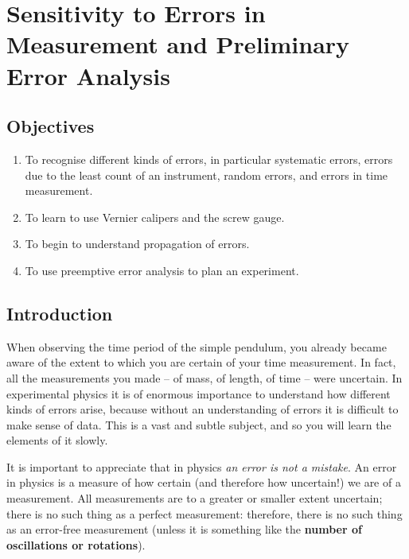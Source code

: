 \chapter{Sensitivity to Errors in Measurement and Preliminary Error Analysis}
\section{Objectives}

\begin{enumerate}
    \item To recognise different kinds of errors, in particular systematic errors, errors due to the least count of an instrument, random errors, and errors in time measurement.
    \item To learn to use Vernier calipers and the screw gauge.
    \item To begin to understand propagation of errors. 
    \item To use preemptive error analysis to plan an experiment. 
    
\end{enumerate}

\section{Introduction}

When observing the time period of the simple pendulum, you already became aware of the extent to which you are certain of your time measurement. In fact, all the measurements you made -- of mass, of length, of time -- were uncertain. In experimental physics it is of enormous importance to understand how different kinds of errors arise, because without an understanding of errors it is difficult to make sense of data. This is a vast and subtle subject, and so you will learn the elements of it slowly.

It is important to appreciate that in physics \textit{an error is not a mistake}. An error in physics is a measure of how certain (and therefore how uncertain!) we are of a measurement. All measurements are to a greater or smaller extent uncertain; there is no such thing as a perfect measurement: therefore, there is no such thing as an error-free measurement (unless it is something like the \textbf{number of oscillations or rotations}). 

